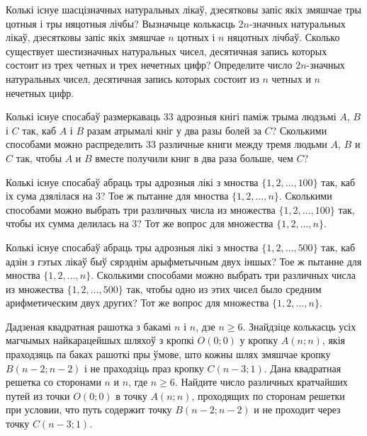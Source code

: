 \begin{problemList}
\bigskip

\problemItemSimple
{Колькі існуе шасцізначных натуральных лікаў, дзесятковы запіс якіх змяшчае тры цотныя
і тры няцотныя лічбы? Вызначыце колькасць $2n$-значных натуральных лікаў,
дзесятковы запіс якіх змяшчае $n$ цотных і $n$ няцотных лічбаў.}
{Сколько существует шестизначных натуральных чисел, десятичная запись
которых состоит из трех четных и трех нечетных цифр? Определите число
$2n$-значных натуральных чисел, десятичная запись которых
состоит из $n$ четных и $n$ нечетных цифр.}

\bigskip

\problemItemSimple
{Колькі існуе спосабаў размеркаваць 33 адрозныя кнігі паміж трыма людзьмі
$A$, $B$ і $C$ так, каб $A$ і $B$ разам атрымалі кніг у два разы болей за $C$?}
{Сколькими способами можно распределить 33 различные книги между тремя
людьми $A$, $B$ и $C$ так, чтобы $A$ и $B$ вместе получили книг в два
раза больше, чем $C$?}

\bigskip

\problemItemSimple
{Колькі існуе спосабаў абраць тры адрозныя лікі з мноства $\{1, 2, \ldots, 100\}$ так,
каб іх сума дзялілася на 3? Тое ж пытанне для мноства $\{1, 2, \ldots, n\}$.}
{Сколькими способами можно выбрать три различных числа из множества
$\{1, 2, \ldots, 100\}$ так, чтобы их сумма делилась на 3? Тот же
вопрос для множества $\{1, 2, \ldots, n\}$.}

\bigskip

\problemItemSimple
{Колькі існуе спосабаў абраць тры адрозныя лікі з мноства $\{1, 2, \ldots, 500\}$ так,
каб адзін з гэтых лікаў быў сярэднім арыфметычным двух іншых?
Тое ж пытанне для мноства $\{1, 2, \ldots, n\}$.}
{Сколькими способами можно выбрать три различных числа из множества
$\{1, 2, \ldots, 500\}$ так, чтобы одно из этих чисел было средним
арифметическим двух других? Тот же вопрос для множества
$\{1, 2, \ldots, n\}$.}

\bigskip

\problemItemSimple
{Дадзеная квадратная рашотка з бакамі $n$ і $n$, дзе $n \ge 6$. Знайдзіце
колькасць усіх магчымых найкарацейшых шляхоў з кропкі $O(0; 0)$ у кропку $A(n; n)$,
якія праходзяць па баках рашоткі пры ўмове, што кожны шлях змяшчае кропку
$B(n - 2; n - 2)$ і не праходзіць праз кропку $C(n - 3; 1)$.}
{Дана квадратная решетка со сторонами $n$ и $n$, где $n \ge 6$. Найдите
число различных кратчайших путей из точки $O(0; 0)$ в точку $A(n; n)$,
проходящих по сторонам решетки при условии, что путь содержит точку
$B(n - 2; n - 2)$ и не проходит через точку $C(n - 3; 1)$.}


\end{problemList}
